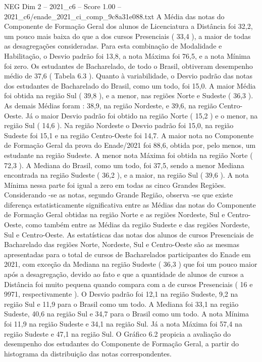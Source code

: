 \begin{textsample}{NEG Dim 2 – 2021\_c6 – Score 1.00 – 2021\_c6/enade\_2021\_ci\_comp\_9c8a31e088.txt}
A Média das notas do Componente de Formação Geral dos alunos de Licenciatura a Distância foi 32,2, um pouco mais baixa do que a dos cursos Presenciais ( 33,4 ), a maior de todas as desagregações consideradas.
Para esta combinação de Modalidade e Habilitação, o Desvio padrão foi 13,8, a nota Máxima foi 76,5, e a nota Mínima foi zero.
Os estudantes de Bacharelado, de todo o Brasil, obtiveram desempenho médio de 37,6 ( Tabela 6.3 ).
Quanto à variabilidade, o Desvio padrão das notas dos estudantes de Bacharelado do Brasil, como um todo, foi 15,0.
A maior Média foi obtida na região Sul ( 39,8 ), e a menor, nas regiões Norte e Sudeste ( 36,3 ).
As demais Médias foram : 38,9, na região Nordeste, e 39,6, na região Centro-Oeste.
Já o maior Desvio padrão foi obtido na região Norte ( 15,2 ) e o menor, na região Sul ( 14,6 ).
Na região Nordeste o Desvio padrão foi 15,0, na região Sudeste foi 15,1 e na região Centro-Oeste foi 14,7.
A maior nota no Componente de Formação Geral da prova do Enade/2021 foi 88,6, obtida por, pelo menos, um estudante na região Sudeste.
A menor nota Máxima foi obtida na região Norte ( 72,3 ).
A Mediana do Brasil, como um todo, foi 37,5, sendo a menor Mediana encontrada na região Sudeste ( 36,2 ), e a maior, na região Sul ( 39,6 ).
A nota Mínima nessa parte foi igual a zero em todas as cinco Grandes Regiões.
Considerando -se as notas, segundo Grande Região, observa -se que existe diferença estatisticamente significativa entre as Médias das notas do Componente de Formação Geral obtidas na região Norte e as regiões Nordeste, Sul e Centro-Oeste, como também entre as Médias da região Sudeste e das regiões Nordeste, Sul e Centro-Oeste.
As estatísticas das notas dos alunos de cursos Presenciais de Bacharelado das regiões Norte, Nordeste, Sul e Centro-Oeste são as mesmas apresentadas para o total de cursos de Bacharelados participantes do Enade em 2021, com exceção da Mediana na região Sudeste ( 36,3 ) que foi um pouco maior após a desagregação, devido ao fato e que a quantidade de alunos de cursos a Distância foi muito pequena quando compara com a de cursos Presenciais ( 16 e 9971, respectivamente ).
O Desvio padrão foi 12,1 na região Sudeste, 9,2 na região Sul e 11,9 para o Brasil como um todo.
A Mediana foi 33,1 na região Sudeste, 40,6 na região Sul e 34,7 para o Brasil como um todo.
A nota Mínima foi 11,9 na região Sudeste e 34,1 na região Sul.
Já a nota Máxima foi 57,4 na região Sudeste e 47,1 na região Sul.
O Gráfico 6.2 propicia a avaliação do desempenho dos estudantes do Componente de Formação Geral, a partir do histograma da distribuição das notas correspondentes.

\end{textsample}

